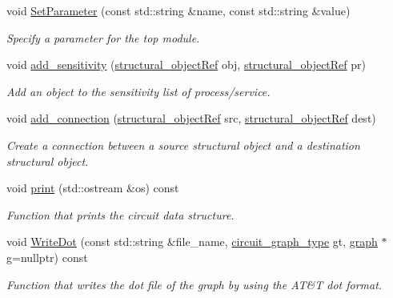 \begin{DoxyCompactItemize}
void \hyperlink{classstructural__manager_ad35143965dc81c7671ff7bad278add97}{Set\+Parameter} (const std\+::string \&name, const std\+::string \&value)
\begin{DoxyCompactList}\small\item\em Specify a parameter for the top module. \end{DoxyCompactList}\item 
void \hyperlink{classstructural__manager_a2205427232393aa5217d394a000a5dde}{add\+\_\+sensitivity} (\hyperlink{structural__objects_8hpp_a8ea5f8cc50ab8f4c31e2751074ff60b2}{structural\+\_\+object\+Ref} obj, \hyperlink{structural__objects_8hpp_a8ea5f8cc50ab8f4c31e2751074ff60b2}{structural\+\_\+object\+Ref} pr)
\begin{DoxyCompactList}\small\item\em Add an object to the sensitivity list of process/service. \end{DoxyCompactList}\item 
void \hyperlink{classstructural__manager_a7e4096354c807a693c242cf296ec2d6d}{add\+\_\+connection} (\hyperlink{structural__objects_8hpp_a8ea5f8cc50ab8f4c31e2751074ff60b2}{structural\+\_\+object\+Ref} src, \hyperlink{structural__objects_8hpp_a8ea5f8cc50ab8f4c31e2751074ff60b2}{structural\+\_\+object\+Ref} dest)
\begin{DoxyCompactList}\small\item\em Create a connection between a source structural object and a destination structural object. \end{DoxyCompactList}\item 
void \hyperlink{classstructural__manager_a4c435578fb3db26a42e2d834443fb2ea}{print} (std\+::ostream \&os) const
\begin{DoxyCompactList}\small\item\em Function that prints the circuit data structure. \end{DoxyCompactList}\item 
void \hyperlink{classstructural__manager_a8e2dcf5f78cb66140be239eeec3ff762}{Write\+Dot} (const std\+::string \&file\+\_\+name, \hyperlink{classstructural__manager_a3ddbeaa6139edd572bbba57042d0a130}{circuit\+\_\+graph\+\_\+type} gt, \hyperlink{structgraph}{graph} $\ast$g=nullptr) const
\begin{DoxyCompactList}\small\item\em Function that writes the dot file of the graph by using the AT\&T dot format. \end{DoxyCompactList}\item 

\end{DoxyCompactItemize}
